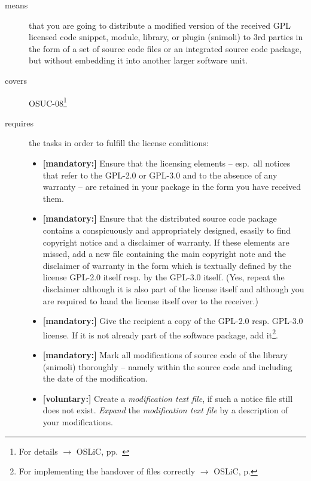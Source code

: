 \begin{description}
\item[means] that you are going to distribute a modified version of the received
GPL licensed code snippet, module, library, or plugin (snimoli) to 3rd
parties in the form of a set of source code files or an integrated source code
package, but without embedding it into another larger software unit.
\item[covers] OSUC-08\footnote{For details $\rightarrow$ OSLiC, pp.\ \pageref{OSUC-08-DEF}}
\item[requires] the tasks in order to fulfill the license conditions:
\begin{itemize}
 
   \item \textbf{[mandatory:]} Ensure that the licensing elements -- esp.\ all
  notices that refer to the GPL-2.0 or GPL-3.0 and to the absence of any
  warranty -- are retained in your package in the form you have received them.

  \item \textbf{[mandatory:]} Ensure that the distributed source code package
  contains a conspicuously and appropriately designed, esasily to find copyright
  notice and a disclaimer of warranty. If these elements are missed, add a new
  file containing the main copyright note and the disclaimer of warranty in the
  form which is textually defined by the license GPL-2.0 itself resp. by the
  GPL-3.0 itself. (Yes, repeat the disclaimer although it is also part of the
  license itself and although you are required to hand the license itself over
  to the receiver.)
  
  \item \textbf{[mandatory:]} Give the recipient a copy of the GPL-2.0 resp.
  GPL-3.0 license. If it is not already part of the software package, add
  it\footnote{For implementing the handover of files correctly $\rightarrow$
  OSLiC, p. \pageref{DistributingFilesHint}}.
  
  
  
  \item \textbf{[mandatory:]} Mark all modifications of source code of the
  library (snimoli) thoroughly -- namely within the source code and including
  the date of the modification.
    
  \item \textbf{[voluntary:]} Create a \emph{modification text file}, if such a
  notice file still does not exist. \emph{Expand} the \emph{modification text
  file} by a description of your modifications.
  

\end{itemize}
\end{description}
